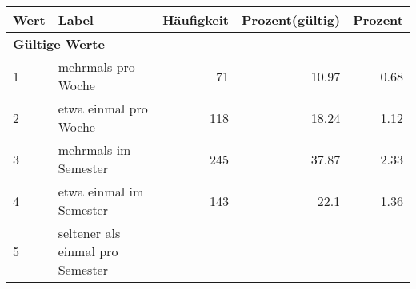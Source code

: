      \begin{longtable}{lXrrr}
     \toprule
     \textbf{Wert} & \textbf{Label} & \textbf{Häufigkeit} & \textbf{Prozent(gültig)} & \textbf{Prozent} \\
     \endhead
     \midrule
     \multicolumn{5}{l}{\textbf{Gültige Werte}}\\

     1 &
     \multicolumn{1}{X}{ mehrmals pro Woche   } &


       \num{71} &
       \num[round-mode=places,round-precision=2]{10,97} &
         \num[round-mode=places,round-precision=2]{0,68} \\

     2 &
     \multicolumn{1}{X}{ etwa einmal pro Woche   } &


       \num{118} &
       \num[round-mode=places,round-precision=2]{18,24} &
         \num[round-mode=places,round-precision=2]{1,12} \\

     3 &
     \multicolumn{1}{X}{ mehrmals im Semester   } &


       \num{245} &
       \num[round-mode=places,round-precision=2]{37,87} &
         \num[round-mode=places,round-precision=2]{2,33} \\

     4 &
     \multicolumn{1}{X}{ etwa einmal im Semester   } &


       \num{143} &
       \num[round-mode=places,round-precision=2]{22,1} &
         \num[round-mode=places,round-precision=2]{1,36} \\

     5 &
     \multicolumn{1}{X}{ seltener als einmal pro Semester   } &



\end{longtable}
